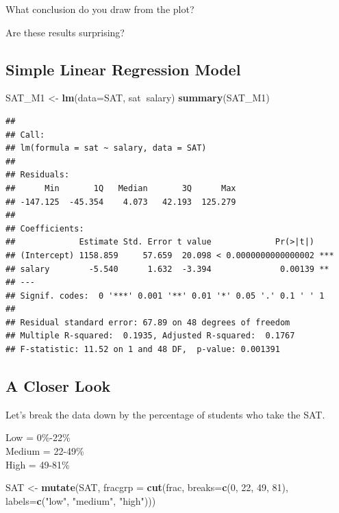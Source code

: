 \documentclass[]{book}
\newenvironment{Shaded}{\begin{snugshade}}{\end{snugshade}}
\newcommand{\KeywordTok}[1]{\textcolor[rgb]{0.13,0.29,0.53}{\textbf{#1}}}
\newcommand{\DataTypeTok}[1]{\textcolor[rgb]{0.13,0.29,0.53}{#1}}
\newcommand{\DecValTok}[1]{\textcolor[rgb]{0.00,0.00,0.81}{#1}}
\newcommand{\StringTok}[1]{\textcolor[rgb]{0.31,0.60,0.02}{#1}}
\newcommand{\OperatorTok}[1]{\textcolor[rgb]{0.81,0.36,0.00}{\textbf{#1}}}
\newcommand{\NormalTok}[1]{#1}
\begin{document}
What conclusion do you draw from the plot?

Are these results surprising?

\subsection{Simple Linear Regression
Model}\label{simple-linear-regression-model}

\begin{Shaded}
\begin{Highlighting}[]
\NormalTok{SAT_M1 <-}\StringTok{ }\KeywordTok{lm}\NormalTok{(}\DataTypeTok{data=}\NormalTok{SAT, sat}\OperatorTok{~}\NormalTok{salary)}
\KeywordTok{summary}\NormalTok{(SAT_M1)}
\end{Highlighting}
\end{Shaded}

\begin{verbatim}
## 
## Call:
## lm(formula = sat ~ salary, data = SAT)
## 
## Residuals:
##      Min       1Q   Median       3Q      Max 
## -147.125  -45.354    4.073   42.193  125.279 
## 
## Coefficients:
##             Estimate Std. Error t value             Pr(>|t|)    
## (Intercept) 1158.859     57.659  20.098 < 0.0000000000000002 ***
## salary        -5.540      1.632  -3.394              0.00139 ** 
## ---
## Signif. codes:  0 '***' 0.001 '**' 0.01 '*' 0.05 '.' 0.1 ' ' 1
## 
## Residual standard error: 67.89 on 48 degrees of freedom
## Multiple R-squared:  0.1935, Adjusted R-squared:  0.1767 
## F-statistic: 11.52 on 1 and 48 DF,  p-value: 0.001391
\end{verbatim}

\subsection{A Closer Look}\label{a-closer-look}

Let's break the data down by the percentage of students who take the
SAT.

Low = 0\%-22\%\\
Medium = 22-49\%\\
High = 49-81\%

\begin{Shaded}
\begin{Highlighting}[]
\NormalTok{SAT <-}\StringTok{ }\KeywordTok{mutate}\NormalTok{(SAT, }\DataTypeTok{fracgrp =} \KeywordTok{cut}\NormalTok{(frac, }
      \DataTypeTok{breaks=}\KeywordTok{c}\NormalTok{(}\DecValTok{0}\NormalTok{, }\DecValTok{22}\NormalTok{, }\DecValTok{49}\NormalTok{, }\DecValTok{81}\NormalTok{), }
      \DataTypeTok{labels=}\KeywordTok{c}\NormalTok{(}\StringTok{"low"}\NormalTok{, }\StringTok{"medium"}\NormalTok{, }\StringTok{"high"}\NormalTok{)))}
\end{Highlighting}
\end{Shaded}
\end{document}
